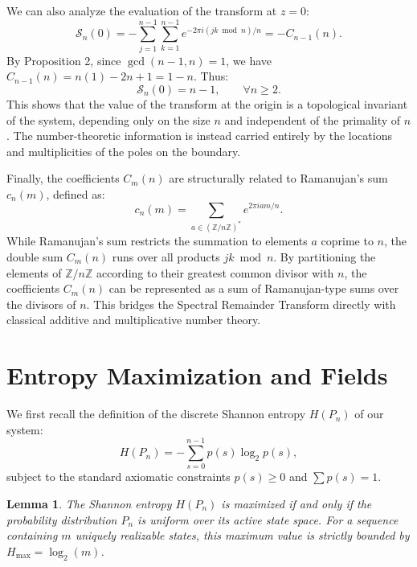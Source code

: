 \documentclass[11pt,twoside]{article}
\newtheorem{lemma}{Lemma}
\begin{document}
	We can also analyze the evaluation of the transform at $z = 0$:
	\begin{equation}
		\mathcal{S}_n(0) = -\sum_{j=1}^{n-1} \sum_{k=1}^{n-1} e^{-2\pi i (jk \bmod n)/n} = -C_{n-1}(n).
	\end{equation}
	By Proposition 2, since $\gcd(n-1, n) = 1$, we have $C_{n-1}(n) = n(1) - 2n + 1 = 1 - n$. Thus:
	\begin{equation}
		\mathcal{S}_n(0) = n - 1, \qquad \forall n \geq 2.
	\end{equation}
	This shows that the value of the transform at the origin is a topological invariant of the system, depending only on the size $n$ and independent of the primality of $n$. The number-theoretic information is instead carried entirely by the locations and multiplicities of the poles on the boundary.
	
	Finally, the coefficients $C_m(n)$ are structurally related to Ramanujan's sum $c_n(m)$, defined as:
	\begin{equation}
		c_n(m) = \sum_{a \in (\mathbb{Z}/n\mathbb{Z})^*} e^{2\pi i a m/n}.
	\end{equation}
	While Ramanujan's sum restricts the summation to elements $a$ coprime to $n$, the double sum $C_m(n)$ runs over all products $jk \bmod n$. By partitioning the elements of $\mathbb{Z}/n\mathbb{Z}$ according to their greatest common divisor with $n$, the coefficients $C_m(n)$ can be represented as a sum of Ramanujan-type sums over the divisors of $n$. This bridges the Spectral Remainder Transform directly with classical additive and multiplicative number theory.
	
	\section{Entropy Maximization and Fields}
	We first recall the definition of the discrete Shannon entropy \cite{shannon1948} $H(P_n)$ of our system:
	\begin{equation}
		H(P_n) = -\sum_{s=0}^{n-1} p(s) \log_2 p(s),
	\end{equation}
	subject to the standard axiomatic constraints $p(s) \ge 0$ and $\sum p(s) = 1$.
	
	\begin{lemma}
		The Shannon entropy $H(P_n)$ is maximized if and only if the probability distribution $P_n$ is uniform over its active state space. For a sequence containing $m$ uniquely realizable states, this maximum value is strictly bounded by $H_{\max} = \log_2(m)$.
	\end{lemma}
	
\end{document}
